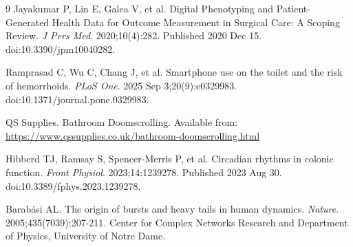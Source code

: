 \documentclass[twocolumn]{article}
\begin{document}
\begin{thebibliography}{9}
	Jayakumar P, Lin E, Galea V, et al. Digital Phenotyping and Patient-Generated Health Data for Outcome Measurement in Surgical Care: A Scoping Review. \textit{J Pers Med}. 2020;10(4):282. Published 2020 Dec 15. doi:10.3390/jpm10040282.
	
	Ramprasad C, Wu C, Chang J, et al. Smartphone use on the toilet and the risk of hemorrhoids. \textit{PLoS One}. 2025 Sep 3;20(9):e0329983. doi:10.1371/journal.pone.0329983.
	
	QS Supplies. Bathroom Doomscrolling. Available from: \url{https://www.qssupplies.co.uk/bathroom-doomscrolling.html}
	
	Hibberd TJ, Ramsay S, Spencer-Merris P, et al. Circadian rhythms in colonic function. \textit{Front Physiol}. 2023;14:1239278. Published 2023 Aug 30. doi:10.3389/fphys.2023.1239278.
	
	Barabási AL. The origin of bursts and heavy tails in human dynamics. \textit{Nature}. 2005;435(7039):207-211. Center for Complex Networks Research and Department of Physics, University of Notre Dame.
\end{thebibliography}
\end{document}
